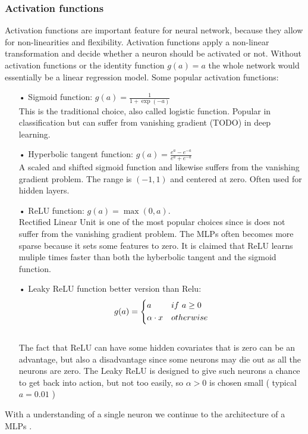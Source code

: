 \subsubsection{Activation functions}
Activation functions are important feature for neural network, because they allow for non-linearities and flexibility. Activation functions apply a non-linear transformation and decide whether a neuron should be activated or not. Without activation functions or the identity function $g(a)=a$ the whole network would essentially be a linear regression model. Some popular activation functions:
\begin{enumerate}
\item[•] Sigmoid function: $g(a)=\frac{1}{1+\exp(-a)}$\\
This is the traditional choice, also called logistic function. Popular in classification but can suffer from vanishing gradient (TODO) in deep learning.
\item[•] Hyperbolic tangent function: $g(a)=\frac{e^a-e^{-a}}{e^a+e^{-a}}$\\
A scaled and shifted sigmoid function and likewise suffers from the vanishing gradient problem. The range is $(-1,1)$ and centered at zero. Often used for hidden layers.
\item[•] ReLU function: $g(a)=\max(0,a)$.\\
Rectified Linear Unit is one of the most popular choices since is does not suffer from the vanishing gradient problem. The MLPs often becomes more sparse because it sets some features to zero. It is claimed that ReLU learns muliple times faster than both the hyberbolic tangent and the sigmoid function.
\item[•] Leaky ReLU function better version than Relu:  \[ g(a)=
    \begin{dcases}
        a & if \ a \geq 0 \\
        \alpha \cdot x & otherwise \\
    \end{dcases}
\]\\
The fact that ReLU can have some hidden covariates that is zero can be an advantage, but also a disadvantage since some neurons may die out as all the neurons are zero. The Leaky ReLU is designed to give such neurons a chance to get back into action, but not too easily, so $\alpha>0$ is chosen small ( typical $a=0.01$ ) 
\end{enumerate}

With a understanding of a single neuron we continue to the architecture of a MLPs \parencite{Goodfellow-et-al-2016} \parencite{Mackay18}.


